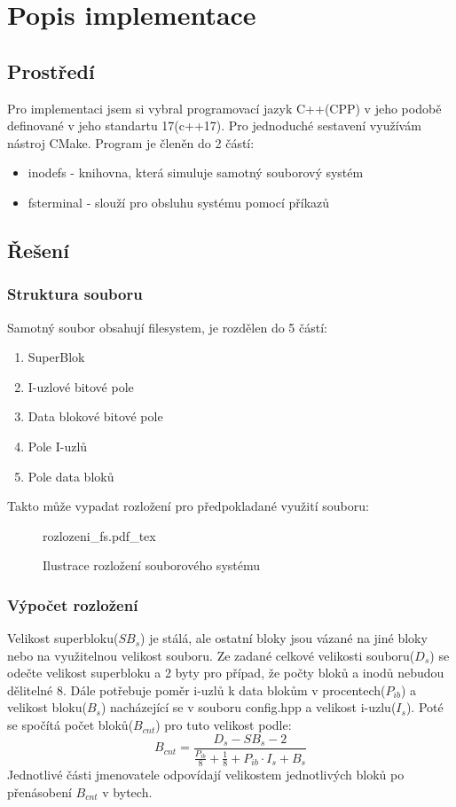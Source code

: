 \documentclass[12pt, a4paper]{report}
\newcommand{\incfig}[1]{%
    \def\svgwidth{\columnwidth}
    {#1.pdf_tex}
}
\begin{document}
\chapter{Popis implementace}
\section{Prostředí}
Pro implementaci jsem si vybral programovací jazyk C++(CPP) v jeho podobě definované v jeho standartu 17(c++17). Pro jednoduché sestavení využívám nástroj CMake. Program je členěn do 2 částí:
\begin{itemize}
 \item inodefs - knihovna, která simuluje samotný souborový systém
 \item fsterminal - slouží pro obsluhu systému pomocí příkazů
\end{itemize}

\section{Řešení}
\subsection{Struktura souboru}
Samotný soubor obsahují filesystem, je rozdělen do 5 částí:
\begin{enumerate}
 \item SuperBlok
 \item I-uzlové bitové pole
 \item Data blokové bitové pole
 \item Pole I-uzlů
 \item Pole data bloků
\end{enumerate}
Takto může vypadat rozložení pro předpokladané využití souboru:\linebreak
\begin{figure}[H]
\centering
\incfig{rozlozeni_fs}
\caption{Ilustrace rozložení souborového systému}
\end{figure} 
\subsection{Výpočet rozložení}
Velikost superbloku($SB_s$) je stálá, ale ostatní bloky jsou vázané na jiné bloky nebo na využitelnou velikost souboru.
Ze zadané celkové velikosti souboru($D_s$) se odečte velikost superbloku a 2 byty pro případ, že počty bloků a inodů nebudou dělitelné 8.
Dále potřebuje poměr i-uzlů k data blokům v procentech($P_{ib}$) a velikost bloku($B_s$) nacházející se v souboru \ttfamily config.hpp
\normalfont a velikost i-uzlu($I_s$). Poté se spočítá počet bloků($B_{cnt}$) pro tuto velikost podle:
\[B_{cnt} = \frac{D_s - SB_s - 2}{\frac{P_{ib}}{8} + \frac{1}{8} + P_{ib}
\cdot I_s + B_s}\]
Jednotlivé části jmenovatele odpovídají velikostem jednotlivých bloků po přenásobení $B_{cnt}$ v bytech.
\end{document}
